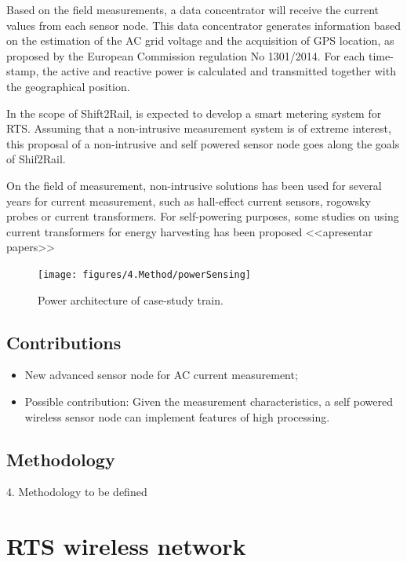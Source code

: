 Based on the field measurements, a data concentrator will receive the current values from each sensor node. This data concentrator generates information based on the estimation of the AC grid voltage and the acquisition of GPS location, as proposed by the European Commission regulation No 1301/2014. For each time-stamp, the active and reactive power is calculated and transmitted together with the geographical position.

In the scope of Shift2Rail, is expected to develop a smart metering system for RTS. Assuming that a non-intrusive measurement system is of extreme interest, this proposal of a non-intrusive and self powered sensor node goes along the goals of Shif2Rail.

On the field of measurement, non-intrusive solutions has been used for several years for current measurement, such as hall-effect current sensors, rogowsky probes or current transformers.
For self-powering purposes, some studies on using current transformers for energy harvesting has been proposed <<apresentar papers>>


\begin{figure}[h!]
	\centering
	\texttt{[image: figures/4.Method/powerSensing]}
	\caption{Power architecture of case-study train.}
	\label{fig:4.powerSensing}
\end{figure}



\subsection{Contributions}

\begin{itemize}
	\setlength\itemsep{0em}
	\item New advanced sensor node for AC current measurement;

	\item Possible contribution: Given the measurement characteristics, a self powered wireless sensor node can implement features of high processing.
\end{itemize}


\subsection{Methodology}

4.	Methodology to be defined



\section{RTS wireless network}
\label{sec:43}

